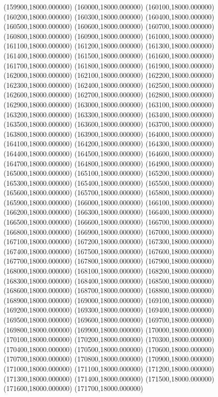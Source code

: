 (159900,18000.000000)
(160000,18000.000000)
(160100,18000.000000)
(160200,18000.000000)
(160300,18000.000000)
(160400,18000.000000)
(160500,18000.000000)
(160600,18000.000000)
(160700,18000.000000)
(160800,18000.000000)
(160900,18000.000000)
(161000,18000.000000)
(161100,18000.000000)
(161200,18000.000000)
(161300,18000.000000)
(161400,18000.000000)
(161500,18000.000000)
(161600,18000.000000)
(161700,18000.000000)
(161800,18000.000000)
(161900,18000.000000)
(162000,18000.000000)
(162100,18000.000000)
(162200,18000.000000)
(162300,18000.000000)
(162400,18000.000000)
(162500,18000.000000)
(162600,18000.000000)
(162700,18000.000000)
(162800,18000.000000)
(162900,18000.000000)
(163000,18000.000000)
(163100,18000.000000)
(163200,18000.000000)
(163300,18000.000000)
(163400,18000.000000)
(163500,18000.000000)
(163600,18000.000000)
(163700,18000.000000)
(163800,18000.000000)
(163900,18000.000000)
(164000,18000.000000)
(164100,18000.000000)
(164200,18000.000000)
(164300,18000.000000)
(164400,18000.000000)
(164500,18000.000000)
(164600,18000.000000)
(164700,18000.000000)
(164800,18000.000000)
(164900,18000.000000)
(165000,18000.000000)
(165100,18000.000000)
(165200,18000.000000)
(165300,18000.000000)
(165400,18000.000000)
(165500,18000.000000)
(165600,18000.000000)
(165700,18000.000000)
(165800,18000.000000)
(165900,18000.000000)
(166000,18000.000000)
(166100,18000.000000)
(166200,18000.000000)
(166300,18000.000000)
(166400,18000.000000)
(166500,18000.000000)
(166600,18000.000000)
(166700,18000.000000)
(166800,18000.000000)
(166900,18000.000000)
(167000,18000.000000)
(167100,18000.000000)
(167200,18000.000000)
(167300,18000.000000)
(167400,18000.000000)
(167500,18000.000000)
(167600,18000.000000)
(167700,18000.000000)
(167800,18000.000000)
(167900,18000.000000)
(168000,18000.000000)
(168100,18000.000000)
(168200,18000.000000)
(168300,18000.000000)
(168400,18000.000000)
(168500,18000.000000)
(168600,18000.000000)
(168700,18000.000000)
(168800,18000.000000)
(168900,18000.000000)
(169000,18000.000000)
(169100,18000.000000)
(169200,18000.000000)
(169300,18000.000000)
(169400,18000.000000)
(169500,18000.000000)
(169600,18000.000000)
(169700,18000.000000)
(169800,18000.000000)
(169900,18000.000000)
(170000,18000.000000)
(170100,18000.000000)
(170200,18000.000000)
(170300,18000.000000)
(170400,18000.000000)
(170500,18000.000000)
(170600,18000.000000)
(170700,18000.000000)
(170800,18000.000000)
(170900,18000.000000)
(171000,18000.000000)
(171100,18000.000000)
(171200,18000.000000)
(171300,18000.000000)
(171400,18000.000000)
(171500,18000.000000)
(171600,18000.000000)
(171700,18000.000000)
